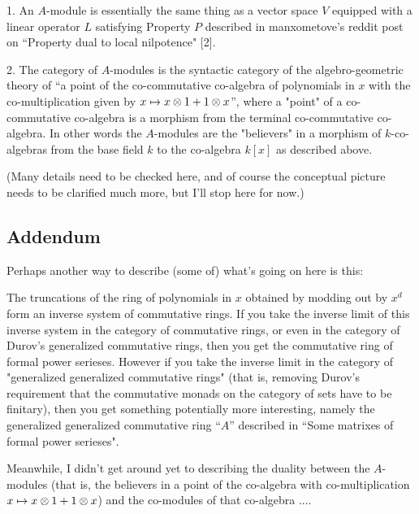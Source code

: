\documentclass[11pt,oneside]{article}
\begin{document}
1.  An $A$-module is essentially the same thing as a vector space $V$
equipped with a linear operator $L$ satisfying Property $P$ described in
manxometove's reddit post on ``Property dual to local nilpotence" [2].

2.  The category of $A$-modules is the syntactic category of the
algebro-geometric theory of ``a point of the co-commutative co-algebra
of polynomials in $x$ with the 
co-multiplication given by $x \mapsto x\otimes 1 + 1\otimes x$'',
where a "point" of a
co-commutative co-algebra is a morphism from the terminal
co-commutative co-algebra.  In other words the $A$-modules are the
"believers" in a morphism of $k$-co-algebras from the base field $k$ to
the co-algebra $k[x]$ as described above.

(Many details need to be checked here, and of course the conceptual
picture needs to be clarified much more, but I'll stop here for now.)

\subsection{Addendum}

Perhaps another way to describe (some of) what's going on here is this:

The truncations of the ring of polynomials in $x$ obtained by modding
out by $x^d$ form an inverse system of commutative rings.  If you take
the inverse limit of this inverse system in the category of
commutative rings, or even in the category of Durov's generalized
commutative rings, then you get the commutative ring of formal power
serieses.  However if you take the inverse limit in the category of
"generalized generalized commutative rings" (that is, removing Durov's
requirement that the commutative monads on the category of sets have
to be finitary), then you get something potentially more interesting,
namely the generalized generalized commutative ring ``$A$'' described in
``Some matrixes of formal power serieses".

Meanwhile, I didn't get around yet to describing the duality between
the $A$-modules (that is, the believers in a point of the co-algebra
with co-multiplication $x \mapsto x\otimes 1 + 1\otimes x$) and the co-modules of that
co-algebra ....



{}

\end{document}
